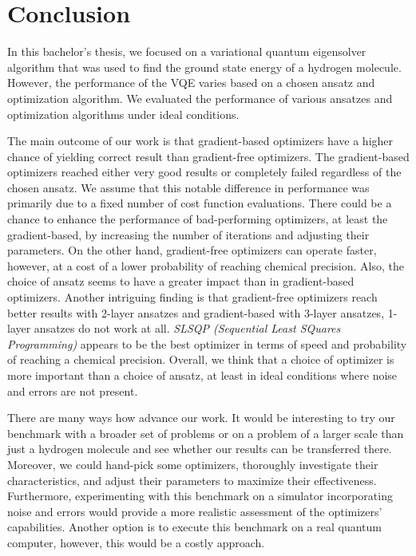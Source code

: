 \chapter*{Conclusion}

In this bachelor's thesis, we focused on a variational quantum eigensolver algorithm that was used to find the ground state energy of a hydrogen molecule. However, the performance of the VQE varies based on a chosen ansatz and optimization algorithm. We evaluated the performance of various ansatzes and optimization algorithms under ideal conditions.

The main outcome of our work is that gradient-based optimizers have a higher chance of yielding correct result than gradient-free optimizers. The gradient-based optimizers reached either very good results or completely failed regardless of the chosen ansatz. We assume that this notable difference in performance was primarily due to a fixed number of cost function evaluations. There could be a chance to enhance the performance of bad-performing optimizers, at least the gradient-based, by increasing the number of iterations and adjusting their parameters. On the other hand, gradient-free optimizers can operate faster, however, at a cost of a lower probability of reaching chemical precision. Also, the choice of ansatz seems to have a greater impact than in gradient-based optimizers. Another intriguing finding is that gradient-free optimizers reach better results with 2-layer ansatzes and gradient-based with 3-layer ansatzes, 1-layer ansatzes do not work at all. \textit{SLSQP (Sequential Least SQuares Programming)} appears to be the best optimizer in terms of speed and probability of reaching a chemical precision. Overall, we think that a choice of optimizer is more important than a choice of ansatz, at least in ideal conditions where noise and errors are not present.
    
There are many ways how advance our work. It would be interesting to try our benchmark with a broader set of problems or on a problem of a larger scale than just a hydrogen molecule and see whether our results can be transferred there. Moreover, we could hand-pick some optimizers, thoroughly investigate their characteristics, and adjust their parameters to maximize their effectiveness. Furthermore, experimenting with this benchmark on a simulator incorporating noise and errors would provide a more realistic assessment of the optimizers' capabilities. Another option is to execute this benchmark on a real quantum computer, however, this would be a costly approach.